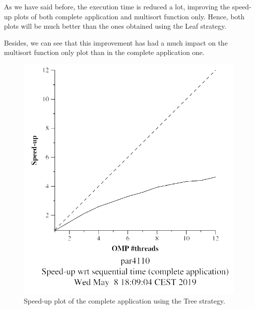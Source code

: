 \documentclass[12pt, a4paper]{article}
\begin{document}
As we have said before, the execution time is reduced a lot, improving the speed-up plots of both complete application and multisort function only. Hence, both plots will be much better than the ones obtained using the Leaf strategy.

Besides, we can see that this improvement has had a much impact on the multisort function only plot than in the complete application one.

\begin{figure}[H]
\centering
\begin{minipage}[b]{0.4\linewidth}
  \centering
  \includegraphics[scale=0.5]{./S2/S2_strong_scalability/multisort-omp-strong_boada-3_tree_complete_application}
  \caption{Speed-up plot of the complete application using the Tree strategy.}
  \label{fig:mandel-omp-10000-strong-21-time}
\end{minipage}%
\hspace{0.5cm}
\begin{minipage}[b]{0.4\linewidth}
  \centering

\end{minipage}
\end{figure}
\end{document}
